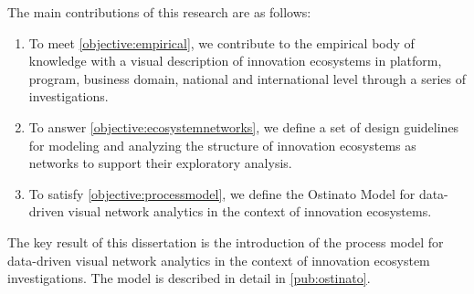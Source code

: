 The main contributions of this research are as follows:

\begin{enumerate}[label=\textbf{Contribution \Roman*},align=left]
  \item To meet \ref{objective:empirical}, we contribute to the empirical body of knowledge with a visual description of innovation ecosystems in platform, program, business domain, national and international level through a series of investigations. 
  \label{contribution:empirical}

  \item To answer \ref{objective:ecosystemnetworks}, we define a set of design guidelines for modeling and analyzing the structure of innovation ecosystems as networks to support their exploratory analysis.
  \label{contribution:ecosystemnetworks}
   
  \item To satisfy \ref{objective:processmodel}, we define the Ostinato Model for data-driven visual network analytics in the context of innovation ecosystems.
  \label{contribution:processmodel}
\end{enumerate}


The key result of this dissertation is the introduction of the process model for data-driven visual network analytics in the context of innovation ecosystem investigations. The model is described in detail in \ref{pub:ostinato}.